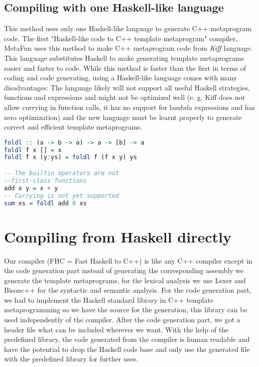\documentclass{article}
\begin{document}
\subsection{Compiling with one Haskell-like language}
This method uses only one Haskell-like language to generate C++ metaprogram code. The first "Haskell-like code to C++ template metaprogram" compiler, MetaFun\cite{metafun} uses this method to make C++ metaprogram code from \textit{Kiff} language. This language substitutes Haskell to make generating template metaprograms easier and faster to code. While this method is faster than the first in terms of coding and code generating, using a Haskell-like language comes with many disadvantages: The language likely will not support all useful Haskell strategies, functions and expressions and might not be optimized well (e. g. Kiff does not allow currying in function calls, it has no support for lambda expressions and has zero optimization) and the new language must be learnt properly to generate  correct and efficient template metaprograms.
\begin{lstlisting}[language=Haskell, caption =Definition of sum using Kiff with comments of missing functions]
foldl :: (a -> b -> a) -> a -> [b] -> a
foldl f x [] = x
foldl f x (y:ys) = foldl f (f x y) ys

-- The builtin operators are not
--first-class functions
add x y = x + y
-- Currying is not yet supported 
sum xs = foldl add 0 xs   
\end{lstlisting}

\section{Compiling from Haskell directly}
Our compiler (FHC = Fast Haskell to C++) is like any C++ compiler except in the code generation part instead of generating the corresponding assembly we generate the template metaprograms, for the lexical analysis we use Lexer and Bisonc++ for the syntactic and semantic analysis. For the code generation part, we had to implement the Haskell standard library in C++ template metaprogramming so we have the source for the generation, this library can be used independently of the compiler. After the code generation part, we got a header file what can be included wherever we want. With the help of the predefined library, the code generated from the compiler is human readable and have the potential to drop the Haskell code base and only use the generated file with the predefined library for further uses.
\end{document}
